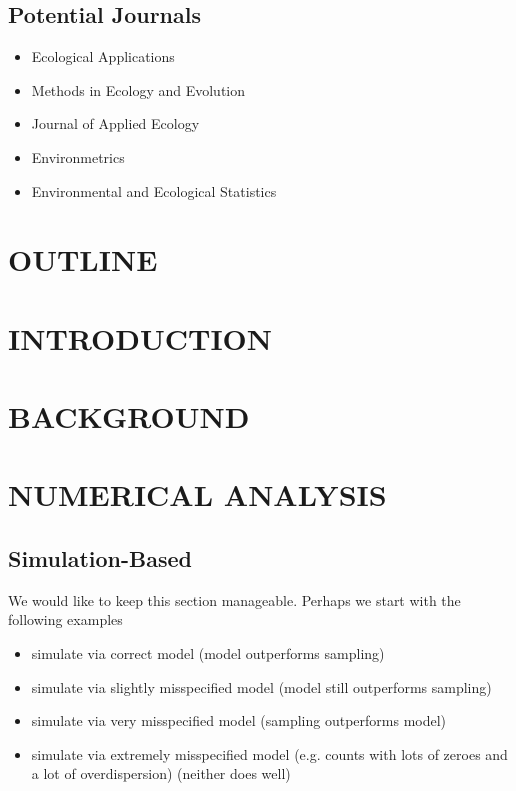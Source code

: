 \subsection*{Potential Journals}
\begin{itemize}
  \item Ecological Applications
  \item Methods in Ecology and Evolution
  \item Journal of Applied Ecology
  \item Environmetrics
  \item Environmental and Ecological Statistics
\end{itemize}


\section*{\centering OUTLINE}

\section{\centering INTRODUCTION}

\section{\centering BACKGROUND}


\section{\centering NUMERICAL ANALYSIS}

\subsection{Simulation-Based}

We would like to keep this section manageable. Perhaps we start with the following examples 
\begin{itemize}
  \item simulate via correct model (model outperforms sampling)
  \item simulate via slightly misspecified model (model still outperforms sampling)
  \item simulate via very misspecified model (sampling outperforms model)
  \item simulate via extremely misspecified model (e.g. counts with lots of zeroes and a lot of overdispersion) (neither does well)
\end{itemize}

